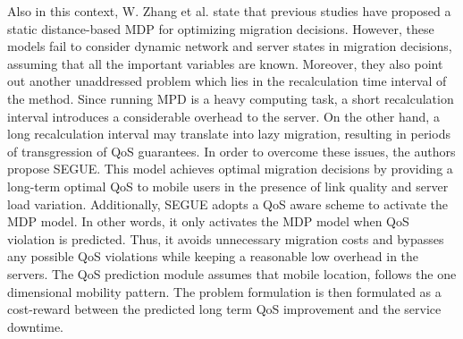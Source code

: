 \noindent\tab Also in this context, W. Zhang et al. \cite{zhang2016segue} state that previous studies have proposed a static distance-based MDP for optimizing migration decisions. However, these models fail to consider dynamic network and server states in migration decisions, assuming that all the important variables are known. Moreover, they also point out another unaddressed problem which lies in the recalculation time interval of the method. Since running MPD is a heavy computing task, a short recalculation interval introduces a considerable overhead to the server. On the other hand, a long recalculation interval may translate into lazy migration, resulting in periods of transgression of QoS guarantees. In order to overcome these issues, the authors propose SEGUE. This model achieves optimal migration decisions by providing a long-term optimal QoS to mobile users in the presence of link quality and server load variation. Additionally, SEGUE adopts a QoS aware scheme to activate the MDP model. In other words, it only activates the MDP model when QoS violation is predicted. Thus, it avoids unnecessary migration costs and bypasses any possible QoS violations while keeping a reasonable low overhead in the servers. The QoS prediction module assumes that mobile location, follows the one dimensional mobility pattern. The problem formulation is then formulated as a cost-reward between the predicted long term QoS improvement and the service downtime.\\

